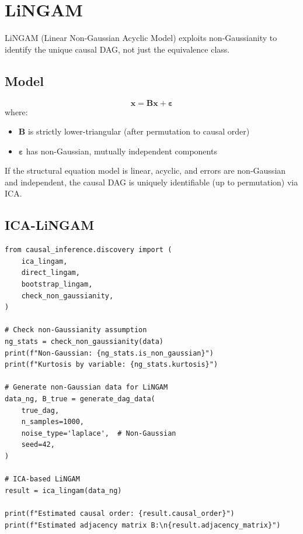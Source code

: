 \section{LiNGAM}

LiNGAM (Linear Non-Gaussian Acyclic Model) exploits non-Gaussianity to identify the unique causal DAG, not just the equivalence class.

\subsection{Model}

\begin{definition}
\begin{equation}
\mathbf{x} = \mathbf{B} \mathbf{x} + \boldsymbol{\varepsilon}
\end{equation}
where:
\begin{itemize}
    \item $\mathbf{B}$ is strictly lower-triangular (after permutation to causal order)
    \item $\boldsymbol{\varepsilon}$ has non-Gaussian, mutually independent components
\end{itemize}
\end{definition}

\begin{theorem}
If the structural equation model is linear, acyclic, and errors are non-Gaussian and independent, the causal DAG is uniquely identifiable (up to permutation) via ICA.
\end{theorem}

\subsection{ICA-LiNGAM}

\begin{verbatim}
from causal_inference.discovery import (
    ica_lingam,
    direct_lingam,
    bootstrap_lingam,
    check_non_gaussianity,
)

# Check non-Gaussianity assumption
ng_stats = check_non_gaussianity(data)
print(f"Non-Gaussian: {ng_stats.is_non_gaussian}")
print(f"Kurtosis by variable: {ng_stats.kurtosis}")

# Generate non-Gaussian data for LiNGAM
data_ng, B_true = generate_dag_data(
    true_dag,
    n_samples=1000,
    noise_type='laplace',  # Non-Gaussian
    seed=42,
)

# ICA-based LiNGAM
result = ica_lingam(data_ng)

print(f"Estimated causal order: {result.causal_order}")
print(f"Estimated adjacency matrix B:\n{result.adjacency_matrix}")
\end{verbatim}

